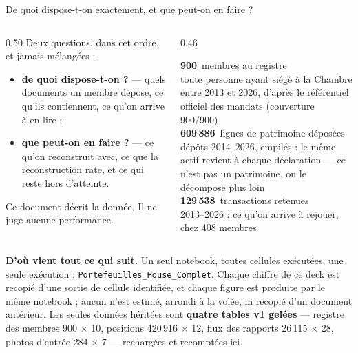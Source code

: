 \documentclass[11pt,aspectratio=169]{beamer}
\newcommand{\co}[1]{\texttt{#1}}
\newcommand{\kpi}[3]{{\large\textbf{\textcolor{#1}{#2}}}~{\footnotesize #3}}
\newcommand{\defl}[1]{{\scriptsize\color{black!55}#1}}
\begin{document}
\begin{frame}{De quoi dispose-t-on exactement, et que peut-on en faire ?}
  \begin{columns}[T]
    \begin{column}{0.50\textwidth}
      \footnotesize
      Deux questions, dans cet ordre, et jamais mélangées :
      \begin{itemize}\itemsep2.5pt
        \item \textbf{de quoi dispose-t-on ?} --- quels documents un membre dépose,
              ce qu'ils contiennent, ce qu'on arrive à en lire ;
        \item \textbf{que peut-on en faire ?} --- ce qu'on reconstruit avec,
              ce que la reconstruction rate, et ce qui reste hors d'atteinte.
      \end{itemize}
      \vspace{2mm}
      \defl{Ce document décrit la donnée. Il ne juge aucune performance.}
    \end{column}
    \begin{column}{0.46\textwidth}
      \footnotesize\raggedright
      \kpi{helec}{900}{membres au registre}\\
      \defl{toute personne ayant siégé à la Chambre entre 2013 et 2026,
        d'après le référentiel officiel des mandats (couverture 900/900)}\\[2.5mm]
      \kpi{dataC}{609\,886}{lignes de patrimoine déposées}\\
      \defl{dépôts 2014--2026, empilés : le même actif revient à chaque
        déclaration --- ce n'est pas un patrimoine, on le décompose plus loin}\\[2.5mm]
      \kpi{okgreen}{129\,538}{transactions retenues}\\
      \defl{2013--2026 : ce qu'on arrive à rejouer, chez 408 membres}
    \end{column}
  \end{columns}
  \vspace{2.5mm}
  \colorbox{black!5}{\parbox{\dimexpr\textwidth-8pt}{\scriptsize\vspace{0.5mm}
    \textbf{D'où vient tout ce qui suit.} Un seul notebook, toutes cellules exécutées, une seule
    exécution : \co{Portefeuilles\_House\_Complet}. Chaque chiffre de ce deck est recopié d'une
    sortie de cellule identifiée, et chaque figure est produite par le même notebook ; aucun n'est
    estimé, arrondi à la volée, ni recopié d'un document antérieur. Les seules données héritées
    sont \textbf{quatre tables v1 gelées} --- registre des membres 900 $\times$ 10, positions
    420\,916 $\times$ 12, flux des rapports 26\,115 $\times$ 28, photos d'entrée 284 $\times$ 7 ---
    rechargées et recomptées ici.\vspace{0.5mm}}}
\end{frame}
\end{document}
